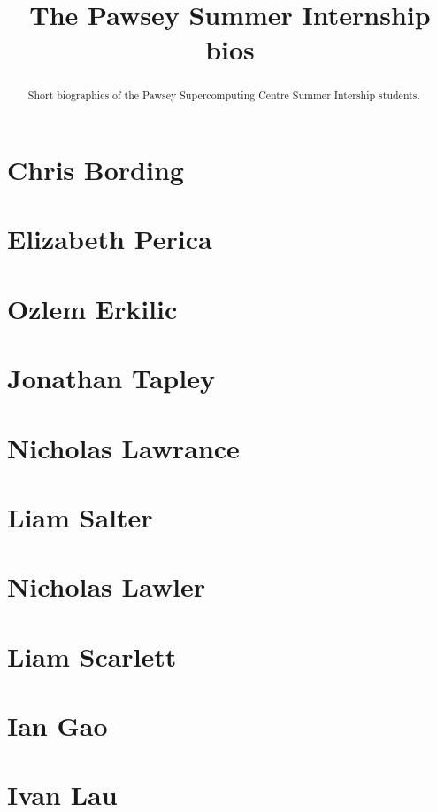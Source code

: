 \documentclass[11pt,a4paper]{report}
\title{The Pawsey Summer Internship bios}
\begin{document}
\maketitle
\tableofcontents


\begin{abstract}

Short biographies of the Pawsey Supercomputing Centre Summer Intership students.

\end{abstract}

\chapter{Chris Bording}



\chapter{Elizabeth Perica}


\chapter{Ozlem Erkilic}


\chapter{Jonathan Tapley}


\chapter{Nicholas Lawrance}


\chapter{Liam Salter}


\chapter{Nicholas Lawler}


\chapter{Liam Scarlett}


\chapter{Ian Gao}


\chapter{Ivan Lau}

\end{document}
